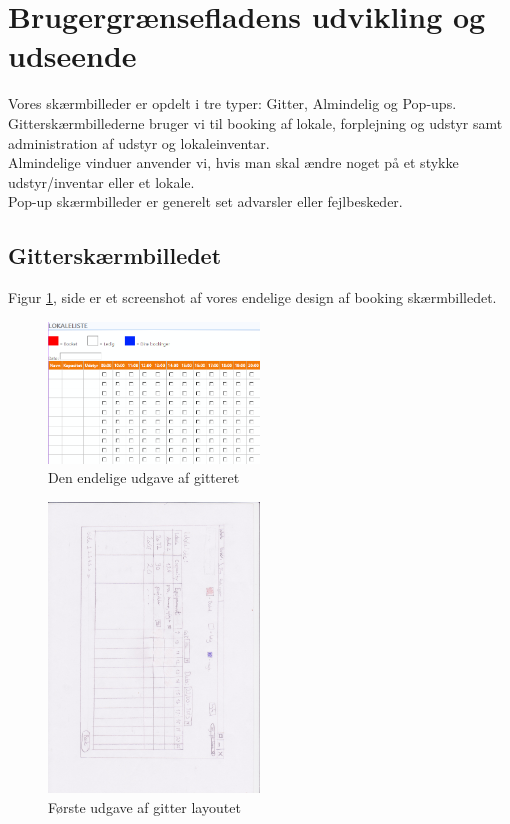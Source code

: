\section{Brugergrænsefladens udvikling og udseende}
\label{Design_G_Development}
Vores skærmbilleder er opdelt i tre typer: Gitter, Almindelig og Pop-ups. 
\\Gitterskærmbillederne bruger vi til booking af lokale, forplejning og udstyr samt administration af udstyr og lokaleinventar.
\\Almindelige vinduer anvender vi, hvis man skal ændre noget på et stykke udstyr/inventar eller et lokale.
\\Pop-up skærmbilleder er generelt set advarsler eller fejlbeskeder.

\subsection{Gitterskærmbilledet}
\label{Design_G_Development_Grid}
Figur \ref{Design_G_Development_FinalGrid}, side \pageref{Design_G_Development_FinalGrid} er et screenshot af vores endelige design af booking skærmbilledet.

\begin{figure}[h!]
  \centering
    \includegraphics[width=0.5\textwidth]{Appendix/GUI-Prototype/DigitalMockup/GridEksempel}
  \caption{Den endelige udgave af gitteret}
\label{Design_G_Development_FinalGrid}
\end{figure}

\begin{figure}[h!]
  \centering
    \includegraphics[width=0.5\textwidth, angle=90]{Appendix/GUI-Prototype/PaperMockup/LokaleListe_001}
  \caption{Første udgave af gitter layoutet}
\label{Design_G_Development_FirstGrid}
\end{figure}

